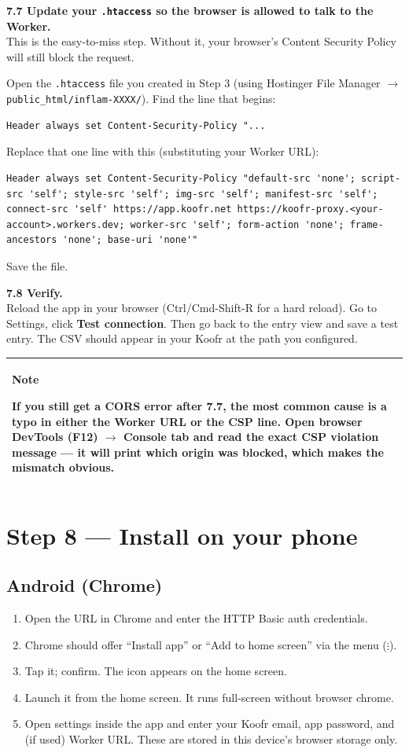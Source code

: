 \documentclass[11pt,a4paper]{article}
\newcommand{\callout}[3]{%
  \begin{center}%
  \begin{tabularx}{\linewidth}{|>{\columncolor{#1}}X|}%
  \hline
  \textbf{#2}\par\smallskip #3\\[2pt]
  \hline
  \end{tabularx}%
  \end{center}%
}
\newcommand{\notebox}[1]{\callout{notebg}{Note}{#1}}
\begin{document}
\textbf{7.7 Update your \texttt{.htaccess} so the browser is allowed to talk to the Worker.}\\
This is the easy-to-miss step. Without it, your browser's Content Security Policy will still block the request.

Open the \texttt{.htaccess} file you created in Step 3 (using Hostinger File Manager $\rightarrow$ \texttt{public\_html/inflam-XXXX/}). Find the line that begins:
\begin{lstlisting}[language=htaccess]
Header always set Content-Security-Policy "...
\end{lstlisting}
Replace that one line with this (substituting your Worker URL):
\begin{lstlisting}[language=htaccess]
Header always set Content-Security-Policy "default-src 'none'; script-src 'self'; style-src 'self'; img-src 'self'; manifest-src 'self'; connect-src 'self' https://app.koofr.net https://koofr-proxy.<your-account>.workers.dev; worker-src 'self'; form-action 'none'; frame-ancestors 'none'; base-uri 'none'"
\end{lstlisting}

Save the file.

\textbf{7.8 Verify.}\\
Reload the app in your browser (Ctrl/Cmd-Shift-R for a hard reload). Go to Settings, click \textbf{Test connection}. Then go back to the entry view and save a test entry. The CSV should appear in your Koofr at the path you configured.

\notebox{If you still get a CORS error after 7.7, the most common cause is a typo in either the Worker URL or the CSP line. Open browser DevTools (F12) $\rightarrow$ Console tab and read the exact CSP violation message --- it will print which origin was blocked, which makes the mismatch obvious.}

\section{Step 8 --- Install on your phone}

\subsection{Android (Chrome)}

\begin{enumerate}[leftmargin=*]
  \item Open the URL in Chrome and enter the HTTP Basic auth credentials.
  \item Chrome should offer ``Install app'' or ``Add to home screen'' via the menu ($\vdots$).
  \item Tap it; confirm. The icon appears on the home screen.
  \item Launch it from the home screen. It runs full-screen without browser chrome.
  \item Open settings inside the app and enter your Koofr email, app password, and (if used) Worker URL. These are stored in this device's browser storage only.
\end{enumerate}
\end{document}
